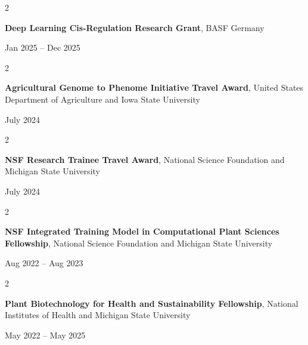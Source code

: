 \documentclass[10pt, letterpaper]{article}
\newenvironment{twocolentry}[2][]{
    \onecolentry
    \def\secondColumn{#2}
    \setcolumnwidth{\fill, 4.5 cm}
    \begin{paracol}{2}
}{
    \switchcolumn \raggedleft \secondColumn
    \end{paracol}
    \endonecolentry
} %
\begin{document}
        \vspace{0.2 cm}

        
        \begin{samepage} 
            \begin{twocolentry}{
                Jan 2025 – Dec 2025
                }
                \textbf{Deep Learning Cis-Regulation Research Grant}, BASF Germany
            \end{twocolentry}
        \end{samepage}  


        \vspace{0.2 cm}

        
        \begin{samepage} 
            \begin{twocolentry}{
                July 2024
                }
                \textbf{Agricultural Genome to Phenome Initiative Travel Award}, United States Department of Agriculture and Iowa State University
            \end{twocolentry}
        \end{samepage}  


        \vspace{0.2 cm}


        \begin{samepage} 
            \begin{twocolentry}{
                July 2024
                }
                \textbf{NSF Research Trainee Travel Award}, National Science Foundation and Michigan State University
            \end{twocolentry}
        \end{samepage}  


        \vspace{0.2 cm}


        \begin{samepage} 
            \begin{twocolentry}{
                Aug 2022 – Aug 2023
                }
                \textbf{NSF Integrated Training Model in Computational Plant Sciences Fellowship}, National Science Foundation and Michigan State University
            \end{twocolentry}
        \end{samepage}  


        \vspace{0.2 cm}


        \begin{samepage} 
            \begin{twocolentry}{
                May 2022 – May 2025
                }
                \textbf{Plant Biotechnology for Health and Sustainability Fellowship}, National Institutes of Health and Michigan State University
            \end{twocolentry}
        \end{samepage} 
\end{document}
